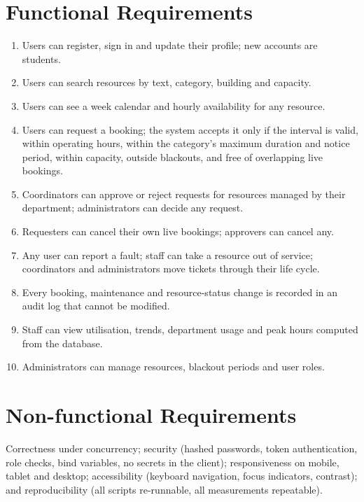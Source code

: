 \documentclass[12pt,a4paper,oneside]{report}
\renewcommand{\_}{\origus\allowbreak}
\begin{document}
\section{Functional Requirements}
\begin{enumerate}[label=FR\arabic*.]
  \item Users can register, sign in and update their profile; new accounts are students.
  \item Users can search resources by text, category, building and capacity.
  \item Users can see a week calendar and hourly availability for any resource.
  \item Users can request a booking; the system accepts it only if the interval is valid, within operating hours, within the category's maximum duration and notice period, within capacity, outside blackouts, and free of overlapping live bookings.
  \item Coordinators can approve or reject requests for resources managed by their department; administrators can decide any request.
  \item Requesters can cancel their own live bookings; approvers can cancel any.
  \item Any user can report a fault; staff can take a resource out of service; coordinators and administrators move tickets through their life cycle.
  \item Every booking, maintenance and resource-status change is recorded in an audit log that cannot be modified.
  \item Staff can view utilisation, trends, department usage and peak hours computed from the database.
  \item Administrators can manage resources, blackout periods and user roles.
\end{enumerate}

\section{Non-functional Requirements}
Correctness under concurrency; security (hashed passwords, token authentication, role checks, bind variables, no secrets in the client); responsiveness on mobile, tablet and desktop; accessibility (keyboard navigation, focus indicators, contrast); and reproducibility (all scripts re-runnable, all measurements repeatable).

\end{document}
